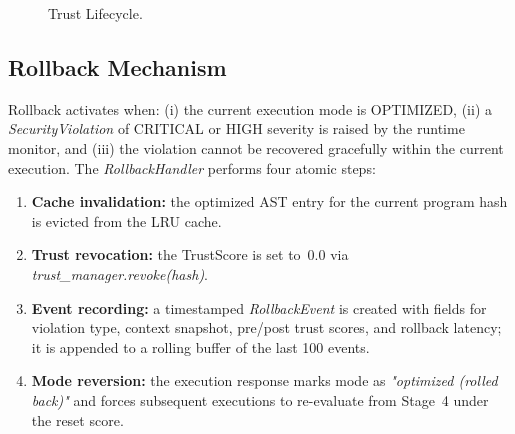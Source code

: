\documentclass[conference]{IEEEtran}
\begin{document}
\begin{figure}[t]
\caption{Trust Lifecycle.}
\label{fig:lifecycle}
\end{figure}

\subsection{Rollback Mechanism}

Rollback activates when: (i) the current execution mode is
OPTIMIZED, (ii) a \textit{SecurityViolation} of CRITICAL or HIGH
severity is raised by the runtime monitor, and (iii) the violation
cannot be recovered gracefully within the current execution. The
\textit{RollbackHandler} performs four atomic steps:

\begin{enumerate}
  \item \textbf{Cache invalidation:} the optimized AST entry for
        the current program hash is evicted from the LRU cache.
  \item \textbf{Trust revocation:} the TrustScore is set to~0.0
        via \textit{trust\_manager.revoke(hash)}.
  \item \textbf{Event recording:} a timestamped
        \textit{RollbackEvent} is created with fields for
        violation type, context snapshot, pre/post trust scores,
        and rollback latency; it is appended to a rolling buffer
        of the last 100 events.
  \item \textbf{Mode reversion:} the execution response marks
        mode as \textit{"optimized (rolled back)"} and forces
        subsequent executions to re-evaluate from Stage~4 under
        the reset score.
\end{enumerate}
\end{document}
